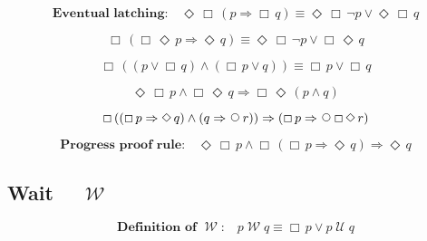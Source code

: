 \documentclass[12pt, fleqn, leqno]{article}
\newcommand{\impl}{\ensuremath{\Rightarrow}}        %
\newcommand{\Until}{\;\mathcal{U}\;}
\newcommand{\Wait}{\;\mathcal{W}\;}
\newcommand{\Next}{\;\,\text{\raisebox{3.5pt}{\circle{6}}}}
\newcommand{\Event}{\Diamond\,}
\newcommand{\Always}{\Box\,}
\newcommand{\spacer}{\vspace{-30pt}}
\begin{document}
\spacer

\begin{equation}\label{E:eventualLatching}
\textbf{Eventual latching:}\quad \Event\Always(p\impl \Always q) \equiv \Event\Always\neg p \lor \Event\Always q
\end{equation}

\spacer

\begin{equation}\label{E:BenAriequiv1}
\Always (\Always\Event p \impl \Event q) \equiv \Event\Always\neg p \lor \Always\Event q
\end{equation}

\spacer

\begin{equation}\label{E:BenAriequiv2}
\Always ((p \lor \Always q) \land (\Always p \lor q)) \equiv \Always p \lor \Always q
\end{equation}

\spacer

\begin{equation}\label{E:eventAlwaysPAndAlwaysEventQ}
\Event\Always p\land \Always\Event q \impl \Always\Event (p\land q)
\end{equation}

\spacer

\begin{equation}\label{E:kroger49}
 \Always ((\Always p \impl \Event q) \land (q \impl \Next r)) \impl (\Always p \impl \Next \Always \Event r)
\end{equation}

\spacer

\begin{equation}\label{E:PrProofRule}
\textbf{Progress proof rule:}\quad \Event\Always p \land \Always(\Always p \impl \Event q) \impl \Event q
\end{equation}

\subsection*{Wait $\quad\Wait$}

\begin{equation}\label{E:defWait}
\textbf{Definition of $\Wait$:}\quad p \Wait q \equiv \Always p\lor p \Until q
\end{equation}
\end{document}
